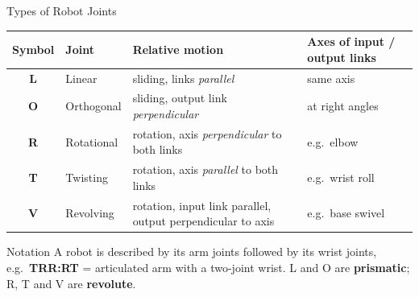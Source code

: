 \documentclass[aspectratio=169]{beamer}
\begin{document}
	\begin{frame}{Types of Robot Joints}
		\renewcommand{\arraystretch}{1.1}
		\centering
		\footnotesize
		\begin{tabular}{@{}clp{4.4cm}p{4.2cm}@{}}
			\toprule
			\textbf{Symbol} & \textbf{Joint} & \textbf{Relative motion} & \textbf{Axes of input / output links} \\
			\midrule
			\textbf{L} & Linear      & sliding, links \emph{parallel}         & same axis \\
			\textbf{O} & Orthogonal  & sliding, output link \emph{perpendicular} & at right angles \\
			\textbf{R} & Rotational  & rotation, axis \emph{perpendicular} to both links & e.g.\ elbow \\
			\textbf{T} & Twisting    & rotation, axis \emph{parallel} to both links & e.g.\ wrist roll \\
			\textbf{V} & Revolving   & rotation, input link parallel, output perpendicular to axis & e.g.\ base swivel \\
			\bottomrule
		\end{tabular}
		\vspace{0.15cm}
		\begin{block}{Notation}
			\small A robot is described by its arm joints followed by its wrist joints, e.g.\ \textbf{TRR:RT} = articulated arm with a two-joint wrist. L and O are \textbf{prismatic}; R, T and V are \textbf{revolute}.
		\end{block}
	\end{frame}
\end{document}
